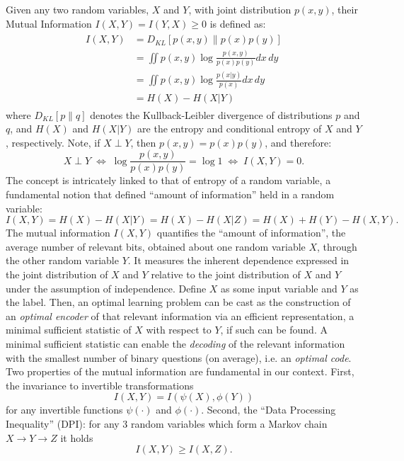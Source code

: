 \documentclass[11pt]{article}
\begin{document}
Given any two random variables, $X$ and $Y$, with joint distribution $p(x, y)$, their Mutual Information $I(X,Y) = I(Y,X) \geq 0$ is defined as:
\begin{align}
\begin{split}
I(X,Y)
&= D_{KL}[p(x,y)\rVert p(x)p(y)] \\[4pt]
&= \iint p(x,y) \log \frac{p(x,y)}{p(x)p(y)} dx\,dy \\
&= \iint p(x,y) \log \frac{p(x\vert y)}{p(x)} dx\,dy \\[4pt]
&= H(X) - H(X\vert Y) 
\end{split}
\end{align}
where $D_{KL}[p\rVert q]$ denotes the Kullback-Leibler divergence of distributions $p$ and $q$, and $H(X)$ and $H(X\vert Y)$ are the entropy and conditional entropy of $X$ and $Y$, respectively. Note, if $X \perp Y$, then $p(x,y) = p(x)p(y)$, and therefore:
\begin{equation}
X \perp Y \; \Leftrightarrow \; \log\frac{p(x,y)}{p(x)p(y)} = \log 1 \; \Leftrightarrow \; I(X,Y) = 0.
\end{equation}
The concept is intricately linked to that of entropy of a random variable, a fundamental notion that defined ``amount of information'' held in a random variable:
\begin{equation}
I(X,Y) = H(X) - H(X \vert Y) = H(X) - H(X \vert Z) = H(X) + H(Y) - H(X,Y).
\end{equation}
The mutual information $I(X,Y)$ quantifies the ``amount of information'', the average number of relevant bits, obtained about one random variable $X$, through the other random variable $Y$. It measures the inherent dependence expressed in the joint distribution of $X$ and $Y$ relative to the joint distribution of $X$ and $Y$ under the assumption of independence. Define $X$ as some input variable and $Y$ as the label. Then, an optimal learning problem can be cast as the construction of an \textit{optimal encoder} of that relevant information via an efficient representation, a minimal sufficient statistic of $X$ with respect to $Y$, if such can be found. A minimal sufficient statistic can enable the \textit{decoding} of the relevant information with the smallest number of binary questions (on average), i.e. an \textit{optimal code}.
Two properties of the mutual information are fundamental in our context. First, the invariance to invertible transformations
\begin{equation}
I(X,Y) = I(\psi(X), \phi(Y))
\end{equation}
for any invertible functions $\psi(\cdot)$ and $\phi(\cdot)$. Second, the ``Data Processing Inequality'' (DPI): for any 3 random variables which form a Markov chain $X\rightarrow Y \rightarrow Z$ it holds
\begin{equation}
I(X,Y) \geq I(X,Z).
\label{eq:dpi}
\end{equation}
\end{document}
